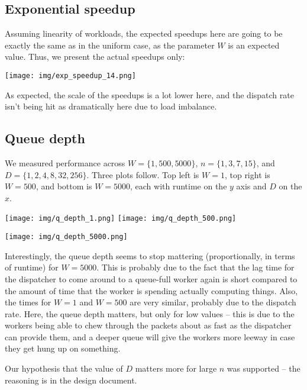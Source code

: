 \documentclass{article}
\begin{document}
\subsection*{Exponential speedup}
Assuming linearity of workloads, the expected speedups here are going to be exactly the same as in the uniform case, as the parameter $W$ is an expected value. Thus, we present the actual speedups only:

\texttt{[image: img/exp\_speedup\_14.png]}

As expected, the scale of the speedups is a lot lower here, and the dispatch rate isn't being hit as dramatically here due to load imbalance. 
\subsection*{Queue depth}
We measured performance across $W=\{1, 500, 5000\}$, $n=\{1, 3, 7, 15\}$, and $D=\{1,2,4,8,32,256\}$. Three plots follow. Top left is $W=1$, top right is $W=500$, and bottom is $W=5000$, each with runtime on the $y$ axis and $D$ on the $x$.

\texttt{[image: img/q\_depth\_1.png]}
\texttt{[image: img/q\_depth\_500.png]}

\texttt{[image: img/q\_depth\_5000.png]}

Interestingly, the queue depth seems to stop mattering (proportionally, in terms of runtime) for $W=5000$. This is probably due to the fact that the lag time for the dispatcher to come around to a queue-full worker again is short compared to the amount of time that the worker is spending actually computing things. Also, the times for $W=1$ and $W=500$ are very similar, probably due to the dispatch rate. Here, the queue depth matters, but only for low values -- this is due to the workers being able to chew through the packets about as fast as the dispatcher can provide them, and a deeper queue will give the workers more leeway in case they get hung up on something. 

Our hypothesis that the value of $D$ matters more for large $n$ was supported -- the reasoning is in the design document. 
\end{document}
